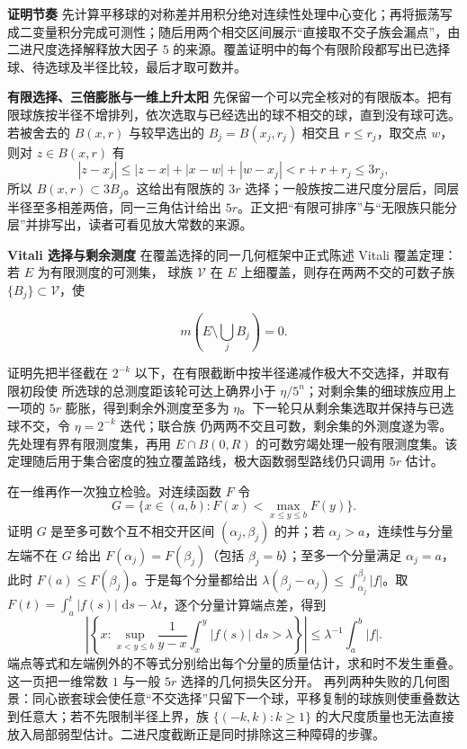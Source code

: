 \documentclass[11pt,a4paper]{ctexart}
\newcommand{\dd}{\,\mathrm d}
\newcommand{\planitem}[1]{\par\smallskip\noindent\textcolor{deepblue}{\textbf{#1}}\quad}
\begin{document}
\planitem{证明节奏}
先计算平移球的对称差并用积分绝对连续性处理中心变化；再将振荡写成二变量积分完成可测性；随后用两个相交区间展示“直接取不交子族会漏点”，由二进尺度选择解释放大因子 $5$ 的来源。覆盖证明中的每个有限阶段都写出已选择球、待选球及半径比较，最后才取可数并。

\planitem{有限选择、三倍膨胀与一维上升太阳}
先保留一个可以完全核对的有限版本。把有限球族按半径不增排列，依次选取与已经选出的球不相交的球，直到没有球可选。若被舍去的 $B(x,r)$ 与较早选出的 $B_j=B(x_j,r_j)$ 相交且 $r\le r_j$，取交点 $w$，则对 $z\in B(x,r)$ 有
\[
 |z-x_j|\le |z-x|+|x-w|+|w-x_j|<r+r+r_j\le3r_j,
\]
所以 $B(x,r)\subset3B_j$。这给出有限族的 $3r$ 选择；一般族按二进尺度分层后，同层半径至多相差两倍，同一三角估计给出 $5r$。正文把“有限可排序”与“无限族只能分层”并排写出，读者可看见放大常数的来源。

\planitem{Vitali 选择与剩余测度}
在覆盖选择的同一几何框架中正式陈述 Vitali 覆盖定理：若 $E$ 为有限测度的可测集，
球族 $\mathcal V$ 在 $E$ 上细覆盖，则存在两两不交的可数子族 $\{B_j\}\subset\mathcal V$，使

\[
m\left(E\setminus\bigcup_jB_j\right)=0.
\]

证明先把半径截在 $2^{-k}$ 以下，在有限截断中按半径递减作极大不交选择，并取有限初段使
所选球的总测度距该轮可达上确界小于 $\eta/5^n$；对剩余集的细球族应用上一项的
$5r$ 膨胀，得到剩余外测度至多为 $\eta$。下一轮只从剩余集选取并保持与已选球不交，令 $\eta=2^{-k}$ 迭代；联合族
仍两两不交且可数，剩余集的外测度遂为零。先处理有界有限测度集，再用
$E\cap B(0,R)$ 的可数穷竭处理一般有限测度集。该定理随后用于集合密度的独立覆盖路线，极大函数弱型路线仍只调用 $5r$ 估计。

在一维再作一次独立检验。对连续函数 $F$ 令
\[
 G=\{x\in(a,b):F(x)<\max_{x\le y\le b}F(y)\}.
\]
   证明 $G$ 是至多可数个互不相交开区间 $(\alpha_j,\beta_j)$ 的并；若
   $\alpha_j>a$，连续性与分量左端不在 $G$ 给出
   $F(\alpha_j)=F(\beta_j)$（包括 $\beta_j=b$）；至多一个分量满足
   $\alpha_j=a$，此时 $F(a)\le F(\beta_j)$。于是每个分量都给出
$\lambda(\beta_j-\alpha_j)\le\int_{\alpha_j}^{\beta_j}|f|$。取
$F(t)=\int_a^t|f(s)|\,\dd s-\lambda t$，逐个分量计算端点差，得到
\[
 \left|\left\{x:\sup_{x<y\le b}\frac1{y-x}\int_x^y|f(s)|\,\dd s>\lambda\right\}\right|
 \le\lambda^{-1}\int_a^b|f|.
\]
端点等式和左端例外的不等式分别给出每个分量的质量估计，求和时不发生重叠。这一页把一维常数 $1$ 与一般 $5r$ 选择的几何损失区分开。
再列两种失败的几何图景：同心嵌套球会使任意“不交选择”只留下一个球，平移复制的球族则使重叠数达到任意大；若不先限制半径上界，族
$\{(-k,k):k\ge1\}$ 的大尺度质量也无法直接放入局部弱型估计。二进尺度截断正是同时排除这三种障碍的步骤。
\end{document}
